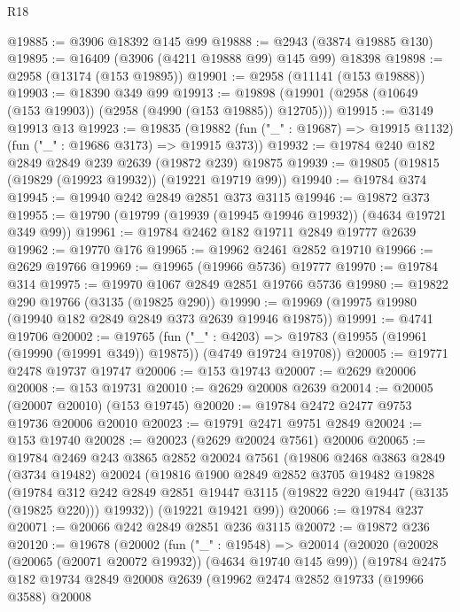 \begin{lexlean}{R18}
\begin{coremodule}
@19885 := @3906 @18392 @145 @99
@19888 := @2943 (@3874 @19885 @130)
@19895 := @16409 (@3906 (@4211 @19888 @99) @145 @99) @18398
@19898 := @2958 (@13174 (@153 @19895))
@19901 := @2958 (@11141 (@153 @19888))
@19903 := @18390 @349 @99
@19913 := @19898 (@19901 (@2958 (@10649 (@153 @19903)) (@2958 (@4990 (@153 @19885)) @12705)))
@19915 := @3149 @19913 @13
@19923 := @19835
    (@19882 (fun ("_" : @19687) => @19915 @1132) (fun ("_" : @19686 @3173) => @19915 @373))
@19932 := @19784 @240 @182 @2849 @2849 @239 @2639 (@19872 @239) @19875
@19939 := @19805 (@19815 (@19829 (@19923 @19932)) (@19221 @19719 @99))
@19940 := @19784 @374
@19945 := @19940 @242 @2849 @2851 @373 @3115
@19946 := @19872 @373
@19955 := @19790 (@19799 (@19939 (@19945 @19946 @19932)) (@4634 @19721 @349 @99))
@19961 := @19784 @2462 @182 @19711 @2849 @19777 @2639
@19962 := @19770 @176
@19965 := @19962 @2461 @2852 @19710
@19966 := @2629 @19766
@19969 := @19965 (@19966 @5736) @19777
@19970 := @19784 @314
@19975 := @19970 @1067 @2849 @2851 @19766 @5736
@19980 := @19822 @290 @19766 (@3135 (@19825 @290))
@19990 := @19969 (@19975 @19980 (@19940 @182 @2849 @2849 @373 @2639 @19946 @19875))
@19991 := @4741 @19706
@20002 := @19765
    (fun ("_" : @4203) =>
    @19783 (@19955 (@19961 (@19990 (@19991 @349)) @19875)) (@4749 @19724 @19708))
@20005 := @19771 @2478 @19737 @19747
@20006 := @153 @19743
@20007 := @2629 @20006
@20008 := @153 @19731
@20010 := @2629 @20008 @2639
@20014 := @20005 (@20007 @20010) (@153 @19745)
@20020 := @19784 @2472 @2477 @9753 @19736 @20006 @20010
@20023 := @19791 @2471 @9751 @2849
@20024 := @153 @19740
@20028 := @20023 (@2629 @20024 @7561) @20006
@20065 := @19784
    @2469
    @243
    @3865
    @2852
    @20024
    @7561
    (@19806
      @2468
      @3863
      @2849
      (@3734 @19482)
      @20024
      (@19816
        @1900
        @2849
        @2852
        @3705
        @19482
        @19828
        (@19784
          @312
          @242
          @2849
          @2851
          @19447
          @3115
          (@19822 @220 @19447 (@3135 (@19825 @220)))
          @19932))
      (@19221 @19421 @99))
@20066 := @19784 @237
@20071 := @20066 @242 @2849 @2851 @236 @3115
@20072 := @19872 @236
@20120 := @19678
    (@20002
      (fun ("_" : @19548) =>
      @20014
        (@20020
          (@20028 (@20065 (@20071 @20072 @19932)) (@4634 @19740 @145 @99))
          (@19784
            @2475
            @182
            @19734
            @2849
            @20008
            @2639
            (@19962
              @2474
              @2852
              @19733
              (@19966 @3588)
              @20008

\end{coremodule}
\end{lexlean}
